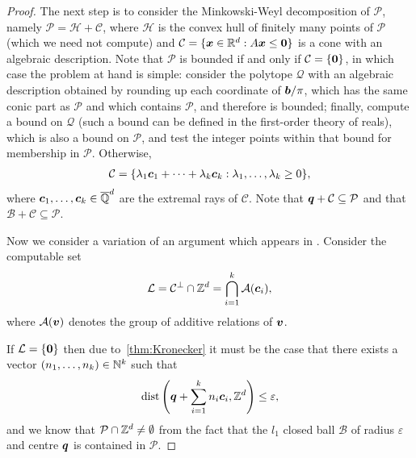 \begin{proof}
The next step is to consider the Minkowski-Weyl decomposition of $\mathcal{P}$, namely $\mathcal{P} = \mathcal{H} + \mathcal{C}$, where $\mathcal{H}$ is the convex hull of finitely many points of $\mathcal{P}$ (which we need not compute) and $\mathcal{C} = \lbrace \boldsymbol{x} \in \mathbb{R}^{d}: A \boldsymbol{x} \leq \boldsymbol{0} \rbrace$ is a cone with an algebraic description. Note that $\mathcal{P}$ is bounded if and only if $\mathcal{C} = \lbrace \boldsymbol{0} \rbrace$, in which case the problem at hand is simple: consider the polytope $\mathcal{Q}$ with an algebraic description obtained by rounding up each coordinate of $\boldsymbol{b} / \pi$, which has the same conic part as $\mathcal{P}$ and which contains $\mathcal{P}$, and therefore is bounded; finally, compute a bound on $\mathcal{Q}$ (such a bound can be defined in the first-order theory of reals), which is also a bound on $\mathcal{P}$, and test the integer points within that bound for membership in $\mathcal{P}$. Otherwise,
\begin{align*}
\mathcal{C} = \lbrace \lambda_{1} \boldsymbol{c}_{1} + \cdots + \lambda_{k} \boldsymbol{c}_{k}: \lambda_{1}, \ldots, \lambda_{k} \geq 0 \rbrace,
\end{align*}
where $\boldsymbol{c}_{1}, \ldots, \boldsymbol{c}_{k} \in \overline{\mathbb{Q}}^{d}$ are the extremal rays of $\mathcal{C}$. Note that $\boldsymbol{q} + \mathcal{C} \subseteq \mathcal{P}$ and that $\mathcal{B} + \mathcal{C} \subseteq \mathcal{P}$.

Now we consider a variation of an argument which appears in \cite{KP}. Consider the computable set
\begin{align*}
{\cal{L}} = \mathcal{C}^{\perp} \cap \mathbb{Z}^{d} = \bigcap\limits_{i=1}^{k} {\cal{A}}(\boldsymbol{c}_{i}) ,
\end{align*}
where ${\cal{A}}(\boldsymbol{v})$ denotes the group of additive relations of $\boldsymbol{v}$.

If ${\cal{L}} = \lbrace \boldsymbol{0} \rbrace$ then due to~\cref{thm:Kronecker} it must be the case that there exists a vector $(n_{1}, \ldots, n_{k}) \in \mathbb{N}^{k}$ such that
\begin{align*}
\operatorname{dist} \left(\boldsymbol{q} + \sum\limits_{i=1}^{k} n_{i} \boldsymbol{c}_{i}, \mathbb{Z}^{d} \right) \leq \varepsilon ,
\end{align*}
and we know that $\mathcal{P} \cap \mathbb{Z}^{d} \neq \emptyset$ from the fact that the $l_{1}$ closed ball $\mathcal{B}$ of radius $\varepsilon$ and centre $\boldsymbol{q}$ is contained in $\mathcal{P}$.


\end{proof}

